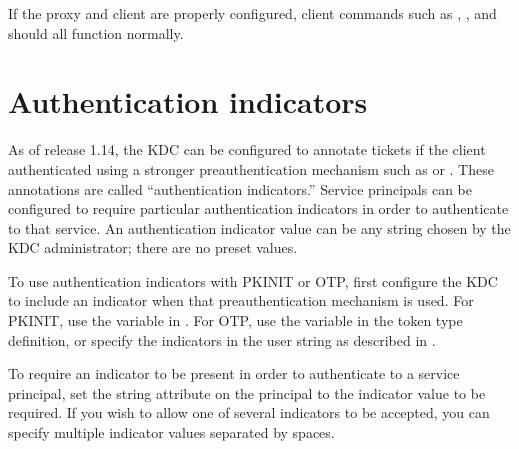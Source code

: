 \documentclass[letterpaper,10pt,english]{sphinxmanual}
\begin{document}
\begin{sphinxVerbatim}[commandchars=\\\{\}]
  
  
\end{sphinxVerbatim}

\sphinxAtStartPar
If the proxy and client are properly configured, client commands such
as , , and  should all function normally.


\chapter{Authentication indicators}
\label{\detokenize{admin/auth_indicator:authentication-indicators}}\label{\detokenize{admin/auth_indicator:auth-indicator}}\label{\detokenize{admin/auth_indicator::doc}}
\sphinxAtStartPar
As of release 1.14, the KDC can be configured to annotate tickets if
the client authenticated using a stronger preauthentication mechanism
such as {\hyperref[\detokenize{admin/pkinit:pkinit}]{}} or {\hyperref[\detokenize{admin/otp:otp-preauth}]{}}.  These
annotations are called “authentication indicators.”  Service
principals can be configured to require particular authentication
indicators in order to authenticate to that service.  An
authentication indicator value can be any string chosen by the KDC
administrator; there are no pre\sphinxhyphen{}set values.

\sphinxAtStartPar
To use authentication indicators with PKINIT or OTP, first configure
the KDC to include an indicator when that preauthentication mechanism
is used.  For PKINIT, use the  variable in
{\hyperref[\detokenize{admin/conf_files/kdc_conf:kdc-conf-5}]{}}.  For OTP, use the  variable in the
token type definition, or specify the indicators in the  user
string as described in {\hyperref[\detokenize{admin/otp:otp-preauth}]{}}.

\sphinxAtStartPar
To require an indicator to be present in order to authenticate to a
service principal, set the  string attribute on the
principal to the indicator value to be required.  If you wish to allow
one of several indicators to be accepted, you can specify multiple
indicator values separated by spaces.
\end{document}
